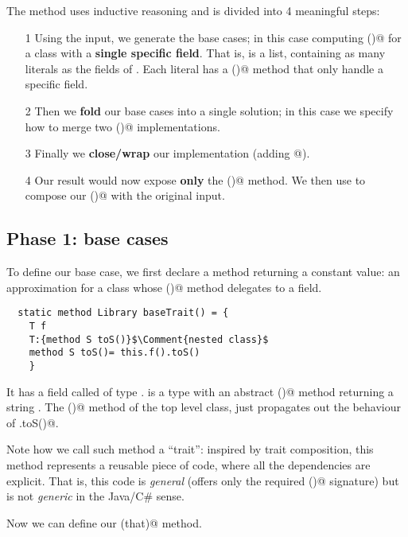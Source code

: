 \noindent
The method uses inductive reasoning and is divided into 4 meaningful steps:
\begin{itemize}
\item[1] Using the input, we generate the base cases;
in this case computing \Q@toS()@ for a class with a \textbf{single specific field}.
That is, \Q@libs@ is a list, containing 
as many \Q@Library@ literals as the fields of \Q@that@.
Each literal has a \Q@toS()@ method that only handle a specific field.
\item[2] Then we  \textbf{fold} our base cases into a single solution; in this case we specify how to merge two \Q@toS()@ implementations.
\item[3] Finally we \textbf{close/wrap} our implementation (adding  \Q@[]@).
\item[4]
Our result \Q@res@ would now expose \textbf{only} the \Q@toS()@ method.
We then use \Q@Override@ to compose our \Q@toS()@ with the original input.
\end{itemize}



\subsection*{Phase 1: base cases}
To define our base case, we first 
 declare a method returning a constant \Q@Library@ value: an approximation for a class
 whose  \Q@toS()@ method delegates to a field.

\begin{lstlisting}
  static method Library baseTrait() = {
    T f
    T:{method S toS()}$\Comment{nested class}$
    method S toS()= this.f().toS()
    }
\end{lstlisting}

It has a field called \Q@f@ of type \Q@T@.
\Q@T@ is a type with an abstract \Q@toS()@ method returning a string \Q@S@.
The \Q@toS()@ method of the top level class, just propagates out
the behaviour of \Q@T.toS()@.

Note how we call such method a ``trait'': inspired by trait composition, 
this method represents a reusable piece of code, where all the dependencies are explicit.
That is, this code is \emph{general} (\Q@T@ offers only the required \Q@toS()@ signature)
but is not \emph{generic} in the Java/C\# sense.

\noindent
Now we can define our \Q@baseCases(that)@ method.

